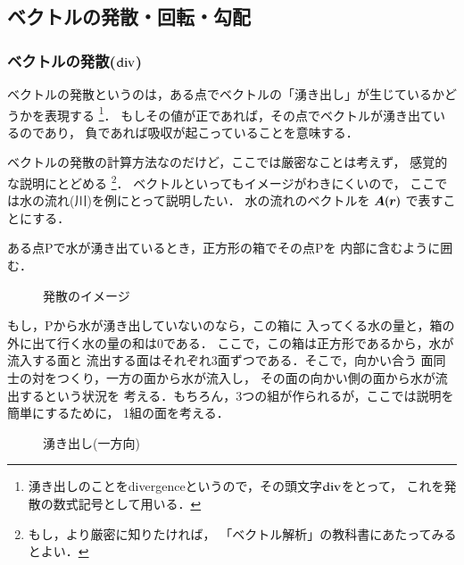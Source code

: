  \subsection{ベクトルの発散・回転・勾配}


 \subsubsection{ベクトルの発散($\rm{div}$)}
        ベクトルの発散というのは，ある点でベクトルの「湧き出し」が生じているかどうかを表現する
            \footnote{
            湧き出しのことをdivergenceというので，その頭文字$\rm{div}$をとって，
            これを発散の数式記号として用いる．
            }．
        もしその値が正であれば，その点でベクトルが湧き出ているのであり，
        負であれば吸収が起こっていることを意味する．

        ベクトルの発散の計算方法なのだけど，ここでは厳密なことは考えず，
        感覚的な説明にとどめる
            \footnote{
                もし，より厳密に知りたければ，
                「ベクトル解析」の教科書にあたってみるとよい．
            }．
        ベクトルといってもイメージがわきにくいので，
        ここでは水の流れ(川)を例にとって説明したい．
        水の流れのベクトルを $\boldsymbol{A}(\boldsymbol{r})$ で表すことにする．

        ある点Pで水が湧き出ているとき，正方形の箱でその点Pを
        内部に含むように囲む．
                \begin{figure}[hbt]
                    \begin{center}
                        \caption{発散のイメージ}
                        \label{fig:div1}
                    \end{center}
                \end{figure}

        もし，Pから水が湧き出していないのなら，この箱に
        入ってくる水の量と，箱の外に出て行く水の量の和は0である．
        ここで，この箱は正方形であるから，水が流入する面と
        流出する面はそれぞれ3面ずつである．そこで，向かい合う
        面同士の対をつくり，一方の面から水が流入し，
        その面の向かい側の面から水が流出するという状況を
        考える．もちろん，3つの組が作られるが，ここでは説明を簡単にするために，
        1組の面を考える．
                \begin{figure}[hbt]
                    \begin{center}
                        \caption{湧き出し(一方向)}
                        \label{fig:div00}
                    \end{center}
                \end{figure}

